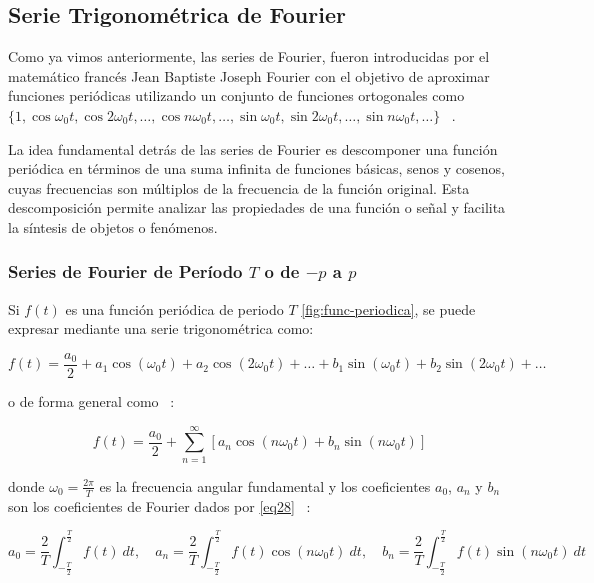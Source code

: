 \subsection{Serie Trigonométrica de Fourier}
Como ya vimos anteriormente, las series de Fourier, fueron introducidas por el matemático francés Jean Baptiste Joseph Fourier con el objetivo de aproximar funciones periódicas utilizando un conjunto de funciones ortogonales como $\{1, \cos \omega_0 t, \cos 2\omega_0 t, \dots, \cos n\omega_0 t, \dots, \sin \omega_0 t, \sin 2\omega_0 t, \dots, \sin n\omega_0 t, \dots\}$ ~\cite{matesAvanzadasZill}.

La idea fundamental detrás de las series de Fourier es descomponer una función periódica en términos de una suma infinita de funciones básicas, senos y cosenos, cuyas frecuencias son múltiplos de la frecuencia de la función original. Esta descomposición permite analizar las propiedades de una función o señal y facilita la síntesis de objetos o fenómenos.


\subsubsection{Series de Fourier de Período $T$ o de $-p$ a $p$}

Si $f(t)$ es una función periódica de periodo $T$ \ref{fig:func-periodica}, se puede expresar mediante una serie trigonométrica como:

\begin{equation}\label{eq26}
	f(t) = \frac{a_0}{2} + a_1 \cos(\omega_0 t) + a_2 \cos(2\omega_0 t) + \dots + b_1 \sin(\omega_0 t) + b_2 \sin(2\omega_0 t) + \dots
\end{equation}


o de forma general como ~\cite{fourierHsu}:

\begin{equation}\label{eq27}
f(t) = \frac{a_0}{2} + \sum_{n=1}^{\infty} \left[a_n \cos(n\omega_0 t) + b_n \sin(n\omega_0 t)\right]
\end{equation}

donde $\omega_0 = \frac{2\pi}{T}$ es la frecuencia angular fundamental y los coeficientes $a_0$, $a_n$ y $b_n$ son los coeficientes de Fourier dados por \eqref{eq28} ~\cite{fourierHsu}: 

\begin{equation}\label{eq28}
	a_0 = \frac{2}{T} \int_{-\frac{T}{2}}^{\frac{T}{2}} f(t) \ dt, \quad a_n = \frac{2}{T} \int_{-\frac{T}{2}}^{\frac{T}{2}} f(t) \cos(n\omega_0 t) \ dt, \quad b_n = \frac{2}{T} \int_{-\frac{T}{2}}^{\frac{T}{2}} f(t) \sin(n\omega_0 t) \ dt
\end{equation}

